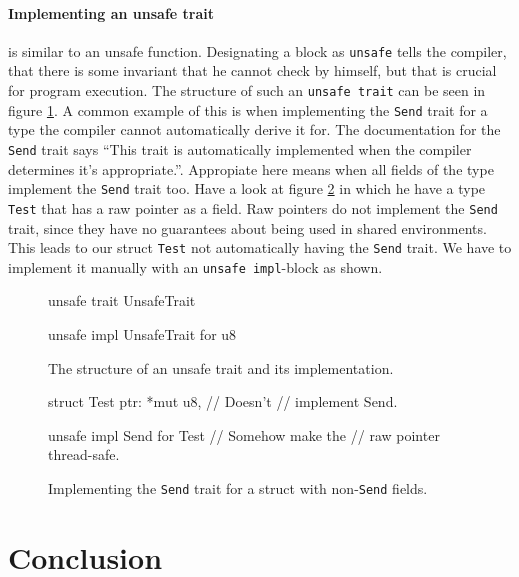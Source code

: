 \documentclass[twocolumn]{article}
\begin{document}
\paragraph{Implementing an unsafe trait} is similar to an unsafe function.
Designating a block as \texttt{unsafe} tells the compiler, that there is some invariant that he cannot check by himself, but that is crucial for program execution.
The structure of such an \texttt{unsafe trait} can be seen in figure \ref{unsafe-trait}.
A common example of this is when implementing the \texttt{Send} trait for a type the compiler cannot automatically derive it for.
The documentation for the \texttt{Send} trait says ``This trait is automatically implemented when the compiler determines it's appropriate.''\cite{RustDoc-Send}.
Appropiate here means when all fields of the type implement the \texttt{Send} trait too.
Have a look at figure \ref{unsafe-send} in which he have a type \texttt{Test} that has a raw pointer as a field.
Raw pointers do not implement the \texttt{Send} trait, since they have no guarantees about being used in shared environments.
This leads to our struct \texttt{Test} not automatically having the \texttt{Send} trait.
We have to implement it manually with an \texttt{unsafe impl}-block as shown.
\begin{figure}
\begin{rustcode}
unsafe trait UnsafeTrait {}

unsafe impl UnsafeTrait for u8 {}
\end{rustcode}
\vspace{-2em}
\caption{The structure of an unsafe trait and its implementation.}
\label{unsafe-trait}
\end{figure}
\begin{figure}
\begin{rustcode}
struct Test {
    ptr: *mut u8, // Doesn't
                  // implement Send.
}

unsafe impl Send for Test {
// Somehow make the
// raw pointer thread-safe.
}
\end{rustcode}
\vspace{-2em}
\caption{Implementing the \texttt{Send} trait for a struct with non-\texttt{Send} fields.}
\label{unsafe-send}
\end{figure}
\section{Conclusion}
\end{document}

